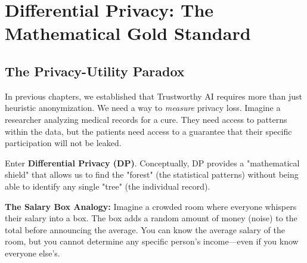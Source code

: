 
\chapter{Differential Privacy: The Mathematical Gold Standard}
\label{chap:differential_privacy}


\section{The Privacy-Utility Paradox}
\label{sec:privacy_utility_paradox}

In previous chapters, we established that Trustworthy AI requires more than just heuristic anonymization. We need a way to \textit{measure} privacy loss. Imagine a researcher analyzing medical records for a cure. They need access to patterns within the data, but the patients need access to a guarantee that their specific participation will not be leaked.

Enter \textbf{Differential Privacy (DP)}. Conceptually, DP provides a "mathematical shield" that allows us to find the "forest" (the statistical patterns) without being able to identify any single "tree" (the individual record).

\begin{svgraybox}
\textbf{The Salary Box Analogy:} Imagine a crowded room where everyone whispers their salary into a box. The box adds a random amount of money (noise) to the total before announcing the average. You can know the average salary of the room, but you cannot determine any specific person's income---even if you know everyone else's.
\end{svgraybox}

